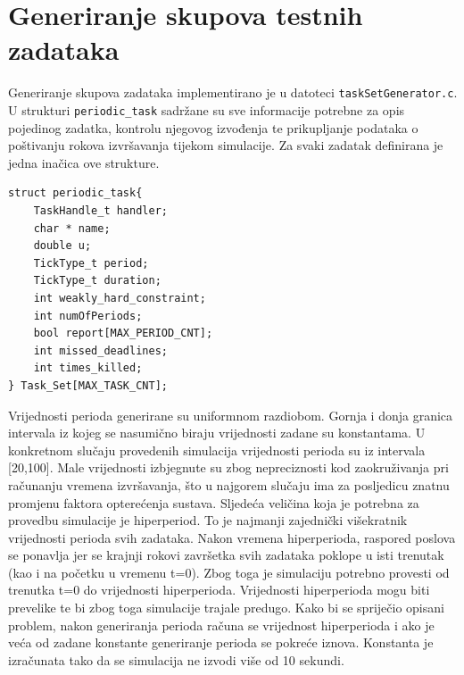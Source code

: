 \documentclass[../zavrsni.tex]{subfiles}
\begin{document}
\sloppy

\justifying

\section{Generiranje skupova testnih zadataka}




Generiranje skupova zadataka implementirano je u datoteci \texttt{taskSetGenerator.c}. U strukturi \texttt{periodic\_task} sadržane su sve 
informacije potrebne za opis pojedinog zadatka, kontrolu njegovog izvođenja te prikupljanje podataka o poštivanju rokova 
izvršavanja tijekom simulacije. Za svaki zadatak definirana je jedna inačica ove strukture. 
\begin{lstlisting}[style=CStyle,caption={Struktura periodic\_task},captionpos=b]
struct periodic_task{
    TaskHandle_t handler;
    char * name;
    double u;
    TickType_t period;
    TickType_t duration;
    int weakly_hard_constraint;
    int numOfPeriods;
    bool report[MAX_PERIOD_CNT];
    int missed_deadlines;
    int times_killed;
} Task_Set[MAX_TASK_CNT];
\end{lstlisting}

Vrijednosti perioda generirane su uniformnom razdiobom. Gornja i donja granica intervala iz kojeg se nasumično biraju vrijednosti zadane su konstantama.
U konkretnom slučaju provedenih simulacija vrijednosti perioda su iz intervala [20,100]. Male vrijednosti izbjegnute su zbog nepreciznosti kod zaokruživanja pri
računanju vremena izvršavanja, što u najgorem slučaju ima za posljedicu znatnu promjenu faktora opterećenja sustava. 
Sljedeća veličina koja je potrebna za 
provedbu simulacije je hiperperiod. To je najmanji zajednički višekratnik vrijednosti perioda svih zadataka. Nakon vremena hiperperioda, raspored poslova 
se ponavlja jer se krajnji rokovi završetka svih zadataka poklope u isti trenutak (kao i na početku u vremenu t=0). Zbog toga je simulaciju potrebno provesti od trenutka t=0 do vrijednosti hiperperioda. 
Vrijednosti hiperperioda mogu biti prevelike te 
bi zbog toga simulacije trajale predugo. Kako bi se spriječio opisani problem, nakon generiranja perioda računa se vrijednost hiperperioda i ako je veća od zadane konstante
 generiranje perioda se pokreće iznova. Konstanta je izračunata tako da se simulacija ne izvodi više od 10 sekundi.
\end{document}

